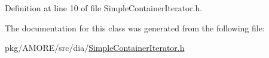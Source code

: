 Definition at line 10 of file SimpleContainerIterator.h.



The documentation for this class was generated from the following file:\begin{DoxyCompactItemize}
\item 
pkg/AMORE/src/dia/\hyperlink{_simple_container_iterator_8h}{SimpleContainerIterator.h}\end{DoxyCompactItemize}
